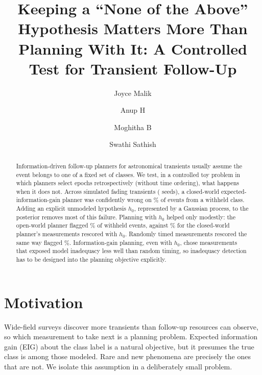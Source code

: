 \documentclass{aastex701}
\begin{document}
\title{Keeping a ``None of the Above'' Hypothesis Matters More Than Planning With It: A Controlled Test for Transient Follow-Up}

\author[0009-0001-8293-8064]{Joyce Malik}
\author{Anup H}
\author{Moghitha B}
\author{Swathi Sathish}

\begin{abstract}
Information-driven follow-up planners for astronomical transients usually assume the event belongs to one of a fixed set of classes. We test, in a controlled toy problem in which planners select epochs retrospectively (without time ordering), what happens when it does not. Across \NEvents{} simulated fading transients (\NSeeds{} seeds), a closed-world expected-information-gain planner was confidently wrong on \BCwWith\% of events from a withheld class. Adding an explicit unmodeled hypothesis $h_0$, represented by a Gaussian process, to the posterior removes most of this failure. Planning with $h_0$ helped only modestly: the open-world planner flagged \PFlagWith\% of withheld events, against \BHFlagWith\% for the closed-world planner's measurements rescored with $h_0$. Randomly timed measurements rescored the same way flagged \RndHFlagWith\%. Information-gain planning, even with $h_0$, chose measurements that exposed model inadequacy less well than random timing, so inadequacy detection has to be designed into the planning objective explicitly.
\end{abstract}

\section{Motivation}
Wide-field surveys \citep{Bellm2019,Ivezic2019} discover more transients than follow-up resources can observe, so which measurement to take next is a planning problem. Expected information gain (EIG) about the class label \citep{Lindley1956,Chaloner1995} is a natural objective, but it presumes the true class is among those modeled. Rare and new phenomena are precisely the ones that are not. We isolate this assumption in a deliberately small problem.
\end{document}
